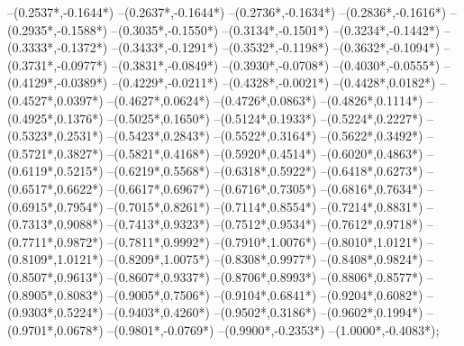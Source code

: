 {	--({0.2537*\xskala},{-0.1644*\yskala})
	--({0.2637*\xskala},{-0.1644*\yskala})
	--({0.2736*\xskala},{-0.1634*\yskala})
	--({0.2836*\xskala},{-0.1616*\yskala})
	--({0.2935*\xskala},{-0.1588*\yskala})
	--({0.3035*\xskala},{-0.1550*\yskala})
	--({0.3134*\xskala},{-0.1501*\yskala})
	--({0.3234*\xskala},{-0.1442*\yskala})
	--({0.3333*\xskala},{-0.1372*\yskala})
	--({0.3433*\xskala},{-0.1291*\yskala})
	--({0.3532*\xskala},{-0.1198*\yskala})
	--({0.3632*\xskala},{-0.1094*\yskala})
	--({0.3731*\xskala},{-0.0977*\yskala})
	--({0.3831*\xskala},{-0.0849*\yskala})
	--({0.3930*\xskala},{-0.0708*\yskala})
	--({0.4030*\xskala},{-0.0555*\yskala})
	--({0.4129*\xskala},{-0.0389*\yskala})
	--({0.4229*\xskala},{-0.0211*\yskala})
	--({0.4328*\xskala},{-0.0021*\yskala})
	--({0.4428*\xskala},{0.0182*\yskala})
	--({0.4527*\xskala},{0.0397*\yskala})
	--({0.4627*\xskala},{0.0624*\yskala})
	--({0.4726*\xskala},{0.0863*\yskala})
	--({0.4826*\xskala},{0.1114*\yskala})
	--({0.4925*\xskala},{0.1376*\yskala})
	--({0.5025*\xskala},{0.1650*\yskala})
	--({0.5124*\xskala},{0.1933*\yskala})
	--({0.5224*\xskala},{0.2227*\yskala})
	--({0.5323*\xskala},{0.2531*\yskala})
	--({0.5423*\xskala},{0.2843*\yskala})
	--({0.5522*\xskala},{0.3164*\yskala})
	--({0.5622*\xskala},{0.3492*\yskala})
	--({0.5721*\xskala},{0.3827*\yskala})
	--({0.5821*\xskala},{0.4168*\yskala})
	--({0.5920*\xskala},{0.4514*\yskala})
	--({0.6020*\xskala},{0.4863*\yskala})
	--({0.6119*\xskala},{0.5215*\yskala})
	--({0.6219*\xskala},{0.5568*\yskala})
	--({0.6318*\xskala},{0.5922*\yskala})
	--({0.6418*\xskala},{0.6273*\yskala})
	--({0.6517*\xskala},{0.6622*\yskala})
	--({0.6617*\xskala},{0.6967*\yskala})
	--({0.6716*\xskala},{0.7305*\yskala})
	--({0.6816*\xskala},{0.7634*\yskala})
	--({0.6915*\xskala},{0.7954*\yskala})
	--({0.7015*\xskala},{0.8261*\yskala})
	--({0.7114*\xskala},{0.8554*\yskala})
	--({0.7214*\xskala},{0.8831*\yskala})
	--({0.7313*\xskala},{0.9088*\yskala})
	--({0.7413*\xskala},{0.9323*\yskala})
	--({0.7512*\xskala},{0.9534*\yskala})
	--({0.7612*\xskala},{0.9718*\yskala})
	--({0.7711*\xskala},{0.9872*\yskala})
	--({0.7811*\xskala},{0.9992*\yskala})
	--({0.7910*\xskala},{1.0076*\yskala})
	--({0.8010*\xskala},{1.0121*\yskala})
	--({0.8109*\xskala},{1.0121*\yskala})
	--({0.8209*\xskala},{1.0075*\yskala})
	--({0.8308*\xskala},{0.9977*\yskala})
	--({0.8408*\xskala},{0.9824*\yskala})
	--({0.8507*\xskala},{0.9613*\yskala})
	--({0.8607*\xskala},{0.9337*\yskala})
	--({0.8706*\xskala},{0.8993*\yskala})
	--({0.8806*\xskala},{0.8577*\yskala})
	--({0.8905*\xskala},{0.8083*\yskala})
	--({0.9005*\xskala},{0.7506*\yskala})
	--({0.9104*\xskala},{0.6841*\yskala})
	--({0.9204*\xskala},{0.6082*\yskala})
	--({0.9303*\xskala},{0.5224*\yskala})
	--({0.9403*\xskala},{0.4260*\yskala})
	--({0.9502*\xskala},{0.3186*\yskala})
	--({0.9602*\xskala},{0.1994*\yskala})
	--({0.9701*\xskala},{0.0678*\yskala})
	--({0.9801*\xskala},{-0.0769*\yskala})
	--({0.9900*\xskala},{-0.2353*\yskala})
	--({1.0000*\xskala},{-0.4083*\yskala});
}
